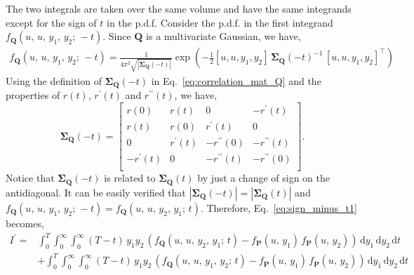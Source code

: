 \documentclass[journal]{IEEEtran}
\theoremstyle{plain}
\theoremstyle{definition}
\theoremstyle{remark}
\newcommand{\dd}{\mathrm{d}}
\newcommand{\rp}{r^\prime}
\newcommand{\rpp}{r^{\prime\prime}}
\begin{document}
The two integrals are taken over the same volume and have the same integrands except for the sign of $t$ in the p.d.f. Consider the p.d.f. in the first integrand $f_{\mathbf{Q}}(u, \,u, \,y_1, \,y_2; \, -t)$. Since $\mathbf{Q}$ is a multivariate Gaussian, we have,
\begin{equation}
\begin{split}
    f_{\mathbf{Q}}(u, \,u, \,y_1, \,y_2; \, -t) = \frac{1}{4\pi^2\sqrt{
    \left|\boldsymbol{\Sigma}_{\mathbf{Q}}(-t)\right|}} \exp\left(- \frac{1}{2}[u,u,y_1,y_2]\, {\boldsymbol{\Sigma}_{\mathbf{Q}}(-t)}^{-1}\, [u,u,y_1,y_2]^\top\right)
\end{split}
\end{equation}
Using the definition of $\boldsymbol{\Sigma}_{\mathbf{Q}}(-t)$ in Eq.~\eqref{eq:correlation_mat_Q} and the properties of $r(t)$, $\rp(t)$ and $\rpp(t)$, we have,
\begin{equation}
\renewcommand{\arraystretch}{1.2}
    \boldsymbol{\Sigma}_{\mathbf{Q}}(-t) = \begin{bmatrix}
                r(0) & r(t) & 0 & -\rp(t) \\
                r(t) & r(0) & \rp(t) & 0 \\
                0 & \rp(t) & -\rpp(0) & -\rpp(t) \\
                -\rp(t) & 0 & -\rpp(t) & -\rpp(0) \\
                \end{bmatrix}.
\end{equation}
Notice that $\boldsymbol{\Sigma}_{\mathbf{Q}}(-t)$ is related to $\boldsymbol{\Sigma}_{\mathbf{Q}}(t)$ by just a change of sign on the antidiagonal. It can be easily verified that $\left|\boldsymbol{\Sigma}_{\mathbf{Q}}(-t)\right| = \left|\boldsymbol{\Sigma}_{\mathbf{Q}}(t)\right|$ and $f_{\mathbf{Q}}(u, \,u, \,y_1, \,y_2; \, -t) = f_{\mathbf{Q}}(u, \,u, \,y_2, \,y_1; \, t)$. Therefore, Eq.~\eqref{eq:sign_minus_t1} becomes,
\begin{equation}
\begin{split}
    I^\prime =& \int_{0}^T \int_{0}^\infty \int_{0}^\infty (T-t) \,y_1 y_2 \,\left( f_{\mathbf{Q}}(u, \,u, \,y_2, \,y_1; \, t) - f_{\mathbf{P}}(u,\,y_1) \, f_{\mathbf{P}}(u,\,y_2)\right)\, \dd y_1 \, \dd y_2 \, \dd t \\
    &+ \int_{0}^T \int_{0}^\infty \int_{0}^\infty (T-t) \, y_1 y_2 \,\left( f_{\mathbf{Q}}(u, \,u, \,y_1, \,y_2; \, t) - f_{\mathbf{P}}(u,\,y_1) \, f_{\mathbf{P}}(u,\,y_2)\right)\, \dd y_1 \, \dd y_2 \, \dd t 
\end{split} 
\end{equation}
\end{document}
